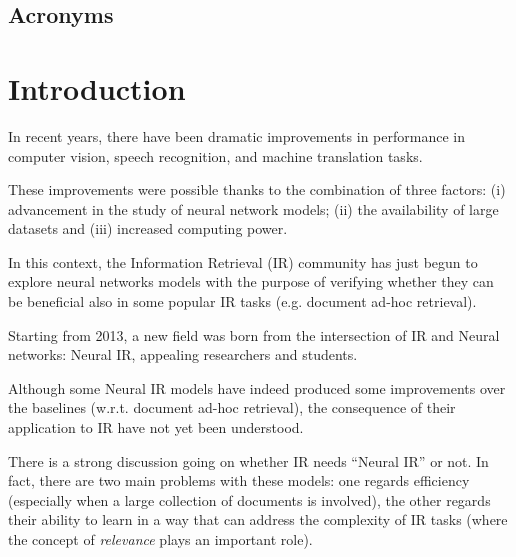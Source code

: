 \newpage
\begin{center}
\section*{Acronyms}
\begin{acronym}
\end{acronym}
\end{center}

\newpage
\chapter{Introduction}

In recent years, there have been dramatic improvements in performance in computer vision, speech recognition, and machine translation tasks.

These improvements were possible thanks to the combination of three factors: (i) advancement in the study of neural network models; (ii) the availability of large datasets and (iii) increased computing power.

In this context, the Information Retrieval (IR) community has just begun to explore neural networks models with the purpose of verifying whether they can be beneficial also in some popular IR tasks (e.g. document ad-hoc retrieval).

Starting from 2013, a new field was born from the intersection of IR and Neural networks: Neural IR, appealing researchers and students.

Although some Neural IR models have indeed produced some improvements over the baselines (w.r.t. document ad-hoc retrieval), the consequence of their application to IR have not yet been understood.

There is a strong discussion going on whether IR needs ``Neural IR'' or not. In fact, there are two main problems with these models: one regards efficiency (especially when a large collection of documents is involved), the other regards their ability to learn in a way that can address the complexity of IR tasks (where the concept of \textit{relevance} plays an important role).

